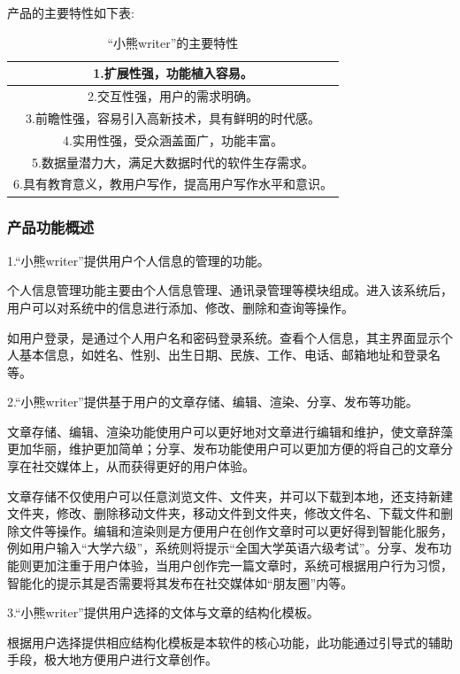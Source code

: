 \documentclass[10pt,letterpaper]{article}
\begin{document}
产品的主要特性如下表:

\begin{table}[!hbp]
\centering
\begin{tabular}{|c|}
\hline
1.扩展性强，功能植入容易。 \\
\hline
2.交互性强，用户的需求明确。 \\
\hline
3.前瞻性强，容易引入高新技术，具有鲜明的时代感。 \\
\hline
4.实用性强，受众涵盖面广，功能丰富。 \\
\hline
5.数据量潜力大，满足大数据时代的软件生存需求。 \\
\hline
6.具有教育意义，教用户写作，提高用户写作水平和意识。 \\
\hline
\end{tabular}
\caption{“小熊writer”的主要特性}\label{tab:aStrangeTable}
\end{table}


\subsubsection{产品功能概述}
1.“小熊writer”提供用户个人信息的管理的功能。

个人信息管理功能主要由个人信息管理、通讯录管理等模块组成。进入该系统后，用户可以对系统中的信息进行添加、修改、删除和查询等操作。

如用户登录，是通过个人用户名和密码登录系统。查看个人信息，其主界面显示个人基本信息，如姓名、性别、出生日期、民族、工作、电话、邮箱地址和登录名等。

2.“小熊writer”提供基于用户的文章存储、编辑、渲染、分享、发布等功能。

文章存储、编辑、渲染功能使用户可以更好地对文章进行编辑和维护，使文章辞藻更加华丽，维护更加简单；分享、发布功能使用户可以更加方便的将自己的文章分享在社交媒体上，从而获得更好的用户体验。

文章存储不仅使用户可以任意浏览文件、文件夹，并可以下载到本地，还支持新建文件夹，修改、删除移动文件夹，移动文件到文件夹，修改文件名、下载文件和删除文件等操作。编辑和渲染则是方便用户在创作文章时可以更好得到智能化服务，例如用户输入“大学六级”，系统则将提示“全国大学英语六级考试”。分享、发布功能则更加注重于用户体验，当用户创作完一篇文章时，系统可根据用户行为习惯，智能化的提示其是否需要将其发布在社交媒体如“朋友圈”内等。

3.“小熊writer”提供用户选择的文体与文章的结构化模板。

根据用户选择提供相应结构化模板是本软件的核心功能，此功能通过引导式的辅助手段，极大地方便用户进行文章创作。
\end{document}
